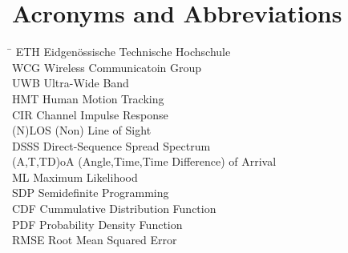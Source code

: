 \section*{Acronyms and Abbreviations}
\begin{tabbing}
 \hspace*{3cm}  \= \kill
 ETH \> Eidgenössische Technische Hochschule \\[0.5ex]
 WCG \> Wireless Communicatoin Group \\[0.5ex]
 UWB \> Ultra-Wide Band\\[0.5ex]
 HMT  \> Human Motion Tracking \\[0.5ex]
 CIR  \> Channel Impulse Response \\[0.5ex]
 (N)LOS  \> (Non) Line of Sight \\[0.5ex]
 DSSS  \> Direct-Sequence Spread Spectrum \\[0.5ex]
 (A,T,TD)oA \> (Angle,Time,Time Difference) of Arrival \\[0.5ex]
 ML  \> Maximum Likelihood\\[0.5ex]
 SDP  \> Semidefinite Programming\\[0.5ex]
 CDF  \> Cummulative Distribution Function\\[0.5ex]
 PDF \> Probability Density Function\\[0.5ex]
 RMSE \> Root Mean Squared Error\\[0.5ex]
\end{tabbing}
